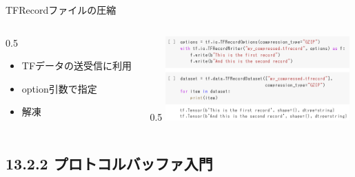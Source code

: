 \documentclass[aspectratio=169, dvipdfmx, 14pt, xcolor={svgnames,dvipsnames}, t]{beamer}
\newlength{\mytotalwidth}
\newlength{\mycolumnwidth}
\begin{document}
\begin{frame}{TFRecordファイルの圧縮}

  \begin{columns}[totalwidth=\mytotalwidth]
    \begin{column}[t]{0.5\mycolumnwidth}
      \begin{itemize}
        \tightlist
        \item
              \alert{TFデータの送受信}に利用
        \item
              option引数で指定
        \item
              解凍
      \end{itemize}
    \end{column}

    \begin{column}[T]{0.5\mycolumnwidth}
      \centering
      \includegraphics[width=200pt]{img/hands-on-ml_13-2-1_1.png}
    \end{column}

  \end{columns}

\end{frame}


\hypertarget{ux30d7ux30edux30c8ux30b3ux30ebux30d0ux30c3ux30d5ux30a1ux5165ux9580}{%
  \subsection{13.2.2 プロトコルバッファ入門}\label{ux30d7ux30edux30c8ux30b3ux30ebux30d0ux30c3ux30d5ux30a1ux5165ux9580}}

\end{document}
